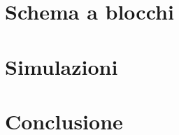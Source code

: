 \documentclass{article}
\begin{document}
    \section{Schema a blocchi}

    \section{Simulazioni}

    \section{Conclusione}
\end{document}

